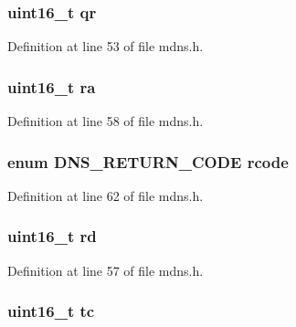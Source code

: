 \hypertarget{structdns__flags__t_ab7bfbea7d3eaf848ba29a8c1bbabbce3}{
\subsubsection[{qr}]{\setlength{\rightskip}{0pt plus 5cm}uint16\-\_\-t qr}}\label{structdns__flags__t_ab7bfbea7d3eaf848ba29a8c1bbabbce3}


Definition at line 53 of file mdns.\-h.

\hypertarget{structdns__flags__t_a9e6a307a79261870745296b01245eadb}{
\subsubsection[{ra}]{\setlength{\rightskip}{0pt plus 5cm}uint16\-\_\-t ra}}\label{structdns__flags__t_a9e6a307a79261870745296b01245eadb}


Definition at line 58 of file mdns.\-h.

\hypertarget{structdns__flags__t_a22b83308deec29b7742059ecf8ed1f5a}{
\subsubsection[{rcode}]{\setlength{\rightskip}{0pt plus 5cm}enum {\bf D\-N\-S\-\_\-\-R\-E\-T\-U\-R\-N\-\_\-\-C\-O\-D\-E} rcode}}\label{structdns__flags__t_a22b83308deec29b7742059ecf8ed1f5a}


Definition at line 62 of file mdns.\-h.

\hypertarget{structdns__flags__t_aa6e6728bc7052b66419fa595fb8ea9ec}{
\subsubsection[{rd}]{\setlength{\rightskip}{0pt plus 5cm}uint16\-\_\-t rd}}\label{structdns__flags__t_aa6e6728bc7052b66419fa595fb8ea9ec}


Definition at line 57 of file mdns.\-h.

\hypertarget{structdns__flags__t_a3dbe362279aee5fe3f0012b7f99fc8d2}{
\subsubsection[{tc}]{\setlength{\rightskip}{0pt plus 5cm}uint16\-\_\-t tc}}\label{structdns__flags__t_a3dbe362279aee5fe3f0012b7f99fc8d2}


